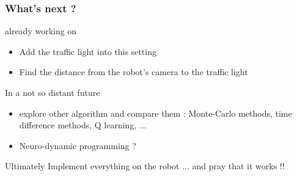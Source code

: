 \documentclass[dvipsnames,svgnames]{beamer}
\begin{document}
\begin{frame}
\frametitle{What's next ? }



\begin{block}{already working on}
\begin{itemize}
\item Add the traffic light into this setting
\item Find the distance from the robot's camera to the traffic light
\end{itemize}
\end{block}

\begin{block}{In a not so distant future}
\begin{itemize}
\item explore other algorithm and compare them : Monte-Carlo methods, time difference methods, Q learning, $\ldots$
\item Neuro-dynamic programming ?
\end{itemize}
\end{block}

\pause
\begin{block}{Ultimately}
Implement everything on the robot ... \pause and pray that it works !!
\end{block}

\end{frame}
\end{document}
